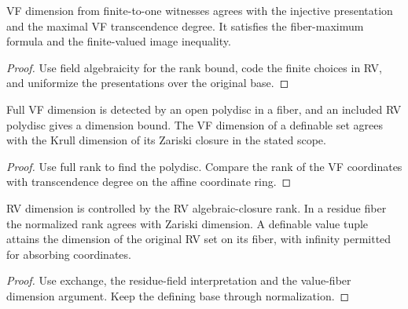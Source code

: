 \begin{lemma}[4.1--4.5. VF dimension]
\label{lem:vf-dimension}
\leanok
VF dimension from finite-to-one witnesses agrees with the injective
presentation and the maximal VF transcendence degree. It satisfies
the fiber-maximum formula and the finite-valued image inequality.
\end{lemma}
\begin{proof}
\leanok
{}
Use field algebraicity for the rank bound, code the finite choices in
RV, and uniformize the presentations over the original base.
\end{proof}

\begin{proposition}
\label{prop:polydiscs}
\leanok
Full VF dimension is detected by an open polydisc in a fiber, and an
included RV polydisc gives a dimension bound. The VF dimension of a
definable set agrees with the Krull dimension of its Zariski closure
in the stated scope.
\end{proposition}
\begin{proof}
\leanok
{}
Use full rank to find the polydisc. Compare the rank of the VF
coordinates with transcendence degree on the affine coordinate ring.
\end{proof}

\begin{lemma}
\label{lem:rv-rank}
\leanok
RV dimension is controlled by the RV algebraic-closure rank. In a
residue fiber the normalized rank agrees with Zariski dimension.
A definable value tuple attains the dimension of the original RV set
on its fiber, with infinity permitted for absorbing coordinates.
\end{lemma}
\begin{proof}
\leanok
{}
Use exchange, the residue-field interpretation and the value-fiber
dimension argument. Keep the defining base through normalization.
\end{proof}

